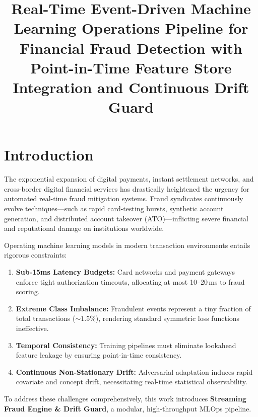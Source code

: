 \documentclass[conference]{IEEEtran}
\begin{document}
\title{Real-Time Event-Driven Machine Learning Operations Pipeline for Financial Fraud Detection with Point-in-Time Feature Store Integration and Continuous Drift Guard}

\author{
}

\maketitle



\section{Introduction}
\label{sec:intro}
The exponential expansion of digital payments, instant settlement networks, and cross-border digital financial services has drastically heightened the urgency for automated real-time fraud mitigation systems. Fraud syndicates continuously evolve techniques—such as rapid card-testing bursts, synthetic account generation, and distributed account takeover (ATO)—inflicting severe financial and reputational damage on institutions worldwide.

Operating machine learning models in modern transaction environments entails rigorous constraints:
\begin{enumerate}
    \item \textbf{Sub-15ms Latency Budgets:} Card networks and payment gateways enforce tight authorization timeouts, allocating at most 10--20\,ms to fraud scoring.
    \item \textbf{Extreme Class Imbalance:} Fraudulent events represent a tiny fraction of total transactions ($\sim 1.5\%$), rendering standard symmetric loss functions ineffective.
    \item \textbf{Temporal Consistency:} Training pipelines must eliminate lookahead feature leakage by ensuring point-in-time consistency.
    \item \textbf{Continuous Non-Stationary Drift:} Adversarial adaptation induces rapid covariate and concept drift, necessitating real-time statistical observability.
\end{enumerate}

To address these challenges comprehensively, this work introduces \textbf{Streaming Fraud Engine \& Drift Guard}, a modular, high-throughput MLOps pipeline.







\end{document}
